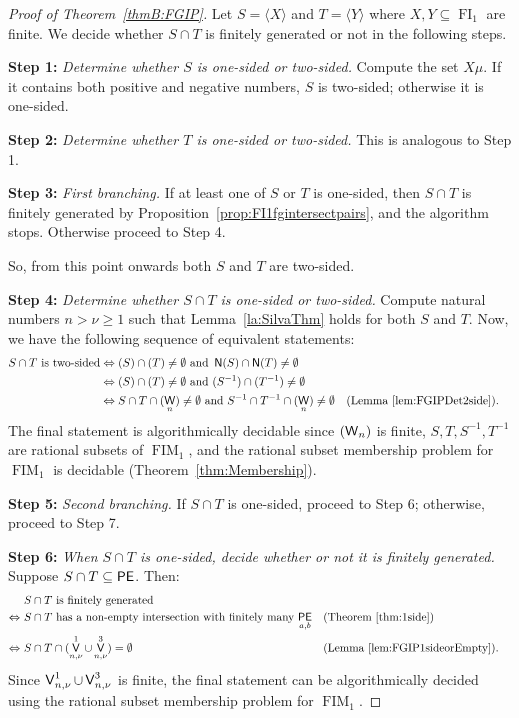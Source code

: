 \documentclass[reqno]{amsart}
\theoremstyle{plain}
\theoremstyle{definition}
\DeclareMathOperator{\FI}{FI}
\DeclareMathOperator{\FIM}{FIM}
\let\P\relax
\DeclareMathOperator{\P}{\textup{\textsf{P}}}
\DeclareMathOperator{\N}{\textup{\textsf{N}}}
\DeclareMathOperator{\PE}{\textup{\textsf{PE}}}
\DeclareMathOperator{\W}{\textup{\textsf{W}}}
\DeclareMathOperator{\V}{\textup{\textsf{V}}}
\numberwithin{equation}{section}
\begin{document}
\begin{proof}[Proof of Theorem~\ref{thmB:FGIP}]
Let $S = \langle X\rangle$ and $T = \langle Y \rangle$ where $X,Y\subseteq\FI_1$ are finite. We decide whether $S\cap T$ is finitely generated or not in the following steps. 

\noindent \textbf{Step 1:} \textit{Determine whether $S$  is one-sided or two-sided.} 
Compute the set $X\mu$. If it contains both positive and negative numbers, $S$ is two-sided; otherwise it is one-sided.


\noindent \textbf{Step 2:} \textit{Determine whether $T$  is one-sided or two-sided.} 
This is analogous to Step 1.

\noindent \textbf{Step 3:} \textit{First branching.} 
If at least one of $S$ or $T$ is one-sided,
then $S\cap T$ is finitely generated by Proposition~\ref{prop:FI1fgintersectpairs}, and the algorithm stops. Otherwise proceed to Step 4.


So, from this point onwards both $S$ and $T$ are two-sided.


\noindent\textbf{Step 4:} \textit{Determine whether $S\cap T$ is one-sided or two-sided.}
Compute natural numbers $n>\nu\geq 1$ such that Lemma~\ref{la:SilvaThm} holds for both $S$ and $T$. Now, we have the following sequence of equivalent statements:
\begin{align*}
    S\cap T \text{ is two-sided}& \Leftrightarrow \P(S)\cap \P(T)\neq\emptyset \text{ and } \N(S)\cap \N(T)\neq\emptyset \\
    &\Leftrightarrow \P(S)\cap \P(T)\neq\emptyset \text{ and } \P(S^{-1})\cap \P(T^{-1})\neq\emptyset\\
    &\Leftrightarrow S\cap T\cap \P(\W_{n})\neq\emptyset \text{ and } S^{-1}\cap T^{-1}\cap \P(\W_{n})\neq\emptyset && \text{(Lemma~\ref{lem:FGIPDet2side}).}
\end{align*}
The final statement is algorithmically decidable since $\P(\W_{n})$ is finite, $S, T, S^{-1}, T^{-1}$ are rational subsets of $\FIM_1$, and the rational subset membership problem for $\FIM_1$ is decidable (Theorem~\ref{thm:Membership}). 


\noindent\textbf{Step 5:}
\textit{Second branching.}
If $S\cap T$ is one-sided, proceed to Step 6;  otherwise, proceed to Step 7.

\noindent\textbf{Step 6:} 
\textit{When $S\cap T$ is one-sided, decide whether or not it is finitely generated.}
Suppose $S\cap T\subseteq \PE$.
Then:
\begin{align*}
    &S\cap T \text{ is finitely generated}\\
    \Leftrightarrow\ & S\cap T \text{ has a non-empty intersection with finitely many $\PE_{a,b}$} && \text{(Theorem~\ref{thm:1side})}\\
    \Leftrightarrow\ & S\cap T\cap (\V_{n,\nu}^1\cup \V_{n,\nu}^3) = \emptyset && \text{(Lemma~\ref{lem:FGIP1sideorEmpty}).}
\end{align*}
Since $\V_{n,\nu}^1\cup \V_{n,\nu}^3$ is finite, the final statement can be algorithmically decided using the rational subset membership problem for $\FIM_1$. 



\end{proof}
\end{document}
